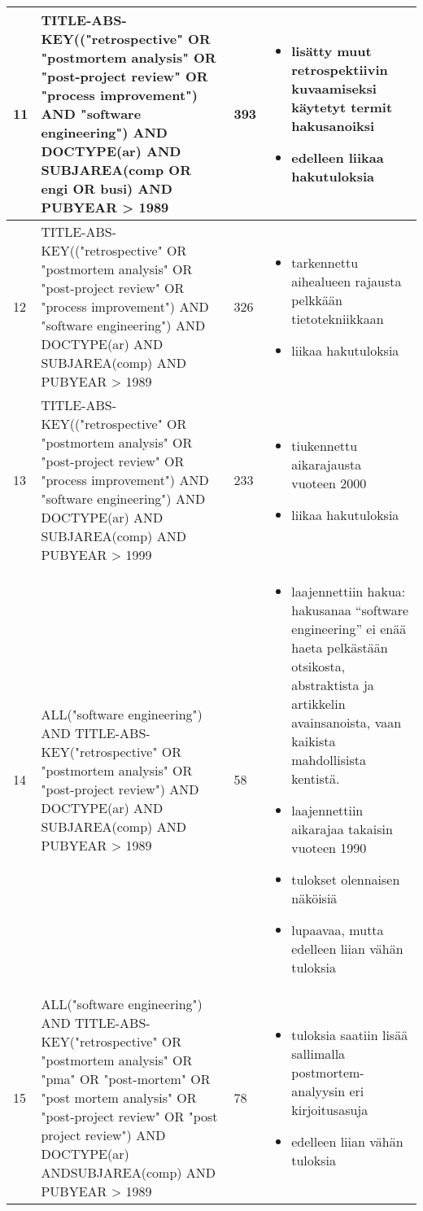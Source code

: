 \begin{center}
\begin{longtable}{|p{1cm}|p{6cm}|p{2cm}|p{7cm}|}
\hline
 11 & TITLE-ABS-KEY(("retrospective" OR "postmortem analysis" OR "post-project review" OR "process improvement") AND "software engineering") AND DOCTYPE(ar) AND SUBJAREA(comp OR engi OR busi) AND PUBYEAR > 1989 & 393 & \begin{itemize} \item lisätty muut retrospektiivin kuvaamiseksi käytetyt termit hakusanoiksi\item edelleen liikaa hakutuloksia \end{itemize} \\
\hline
 12 & TITLE-ABS-KEY(("retrospective" OR "postmortem analysis" OR "post-project review" OR "process improvement") AND "software engineering") AND DOCTYPE(ar) AND SUBJAREA(comp) AND PUBYEAR > 1989 & 326 & \begin{itemize} \item tarkennettu aihealueen rajausta pelkkään tietotekniikkaan \item liikaa hakutuloksia \end{itemize} \\
\hline
 13 & TITLE-ABS-KEY(("retrospective" OR "postmortem analysis" OR "post-project review" OR "process improvement") AND "software engineering") AND DOCTYPE(ar) AND SUBJAREA(comp) AND PUBYEAR > 1999 & 233 & \begin{itemize} \item tiukennettu aikarajausta vuoteen 2000\item liikaa hakutuloksia \end{itemize} \\
\hline
 14 & ALL("software engineering") AND TITLE-ABS-KEY("retrospective" OR "postmortem analysis" OR "post-project review") AND DOCTYPE(ar) AND SUBJAREA(comp) AND PUBYEAR > 1989 & 58 & \begin{itemize} \item laajennettiin hakua: hakusanaa “software engineering” ei enää haeta pelkästään otsikosta, abstraktista ja artikkelin avainsanoista, vaan kaikista mahdollisista kentistä.\item laajennettiin aikarajaa takaisin vuoteen 1990\item tulokset olennaisen näköisiä \item lupaavaa, mutta edelleen liian vähän tuloksia \end{itemize} \\
\hline
 15 & ALL("software engineering") AND TITLE-ABS-KEY("retrospective" OR "postmortem analysis" OR "pma" OR "post-mortem" OR "post mortem analysis" OR "post-project review" OR "post project review") AND DOCTYPE(ar) ANDSUBJAREA(comp) AND PUBYEAR > 1989 & 78 & \begin{itemize} \item tuloksia saatiin lisää sallimalla postmortem-analyysin eri kirjoitusasuja\item edelleen liian vähän tuloksia \end{itemize} \\

\end{longtable}
\end{center}
